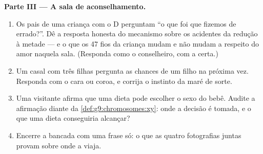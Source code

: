 \begin{problem}
\medskip\noindent\textbf{Parte III --- A sala de
aconselhamento.}
\begin{enumerate}[resume]
  \item Os pais de uma criança com o  D perguntam
        ``o que foi que fizemos de errado?''. Dê a resposta
        honesta do mecanismo sobre os acidentes da redução à
        metade --- e o que os 47 fios da criança mudam e não
        mudam a respeito do amor naquela sala. (Responda
        como o conselheiro, com a  certa.)
  \item Um casal com três filhas pergunta as chances de um
        filho na próxima vez. Responda com o cara ou coroa,
        e corrija o instinto da maré de sorte.
  \item Uma visitante afirma que uma dieta pode escolher o
        sexo do bebê. Audite a afirmação diante da
        \cref{def:g9:chromosomes:xy}: onde a decisão é
        tomada, e o que uma dieta conseguiria alcançar?
  \item Encerre a bancada com uma frase só: o que as quatro
        fotografias juntas provam sobre onde a
         viaja.
\end{enumerate}
\end{problem}
